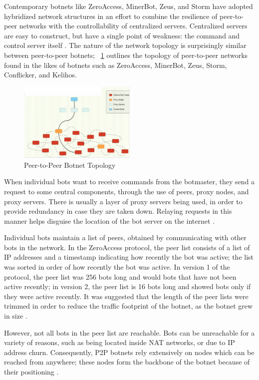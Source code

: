 \documentclass{acm_proc_article-sp}
\begin{document}
Contemporary botnets like ZeroAccess, MinerBot, Zeus, and Storm have adopted hybridized network structures in an effort to combine the resilience of peer-to-peer networks with the controllability of centralized servers.  Centralized servers are easy to construct, but have a single point of weakness: the command and control server itself \cite{wang:p2p}.  The nature of the network topology is surprisingly similar between peer-to-peer botnets;  ~\ref{fig:p2p-architecture} outlines the topology of peer-to-peer networks found in the likes of botnets such as ZeroAccess, MinerBot, Zeus, Storm, Conflicker, and Kelihos.

\begin{figure}[here]
\includegraphics[width=0.5\textwidth]{p2p-architecture.png}
\caption{Peer-to-Peer Botnet Topology}
\label{fig:p2p-architecture}
\end{figure}


When individual bots want to receive commands from the botmaster, they send a request to some central components, through the use of peers, proxy nodes, and proxy servers. There is usually a layer of proxy servers being used, in order to provide redundancy in case they are taken down. Relaying requests in this manner helps disguise the location of the bot server on the internet \cite{defcon:prowling}.

Individual bots maintain a list of peers, obtained by communicating with other bots in the network.  In the ZeroAccess protocol, the peer list consists of a list of IP addresses and a timestamp indicating how recently the bot was active; the list was sorted in order of how recently the bot was active. In version 1 of the protocol, the peer list was 256 bots long and would bots that have not been active recently; in version 2, the peer list is 16 bots long and showed bots only if they were active recently.  It was suggested that the length of the peer lists were trimmed in order to reduce the traffic footprint of the botnet, as the botnet grew in size  \cite{defcon:prowling}.  

However, not all bots in the peer list are reachable.  Bots can be unreachable for a variety of reasons, such as being located inside NAT networks, or due to IP address churn.   Consequently, P2P botnets rely extensively on nodes which can be reached from anywhere; these nodes form the backbone of the botnet because of their positioning \cite{defcon:prowling}.
\end{document}
